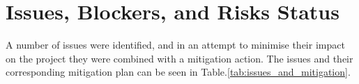 \section{Issues, Blockers, and Risks Status}




A number of issues were identified, and in an attempt to minimise their impact on the project they were combined with a mitigation action. The issues and their corresponding mitigation plan can be seen in Table.\:\ref{tab:issues_and_mitigation}. 
